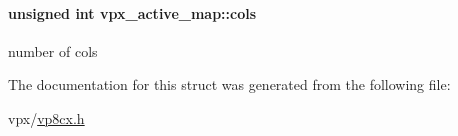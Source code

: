 \paragraph[{\texorpdfstring{cols}{cols}}]{\setlength{\rightskip}{0pt plus 5cm}unsigned int vpx\+\_\+active\+\_\+map\+::cols}\hypertarget{structvpx__active__map_a310edb5efc62d596b2c276e3f7d1b42a}{}\label{structvpx__active__map_a310edb5efc62d596b2c276e3f7d1b42a}
number of cols 

The documentation for this struct was generated from the following file\+:\begin{DoxyCompactItemize}
\item 
vpx/\hyperlink{vp8cx_8h}{vp8cx.\+h}\end{DoxyCompactItemize}
